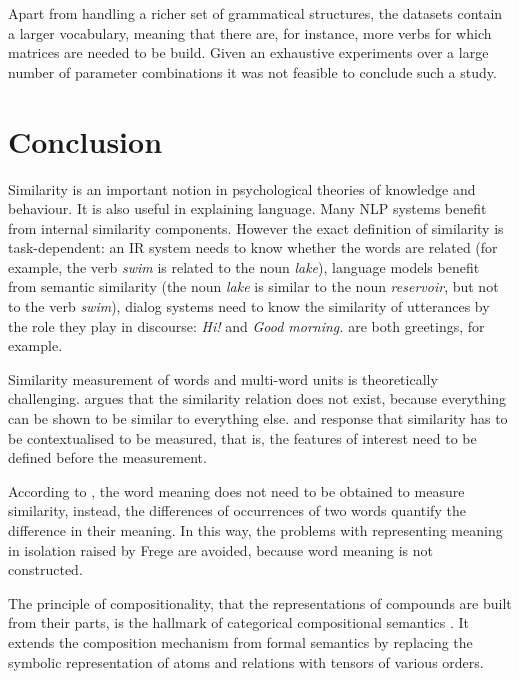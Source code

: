 Apart from handling a richer set of grammatical structures, the datasets contain a larger vocabulary, meaning that there are, for instance, more verbs for which matrices are needed to be build. Given an exhaustive experiments over a large number of parameter combinations it was not feasible to conclude such a study.

\section{Conclusion}
\label{sec:conclusion-background}

Similarity is an important notion in psychological theories of knowledge and behaviour. It is also useful in explaining language. Many NLP systems benefit from internal similarity components. However the exact definition of similarity is task-dependent: an IR system needs to know whether the words are related (for example, the verb \textit{swim} is related to the noun \textit{lake}), language models benefit from semantic similarity (the noun \textit{lake} is similar to the noun \textit{reservoir}, but not to the verb \textit{swim}), dialog systems need to know the similarity of utterances by the role they play in  discourse: \textit{Hi!} and \textit{Good morning.} are both greetings, for example.

Similarity measurement of words and multi-word units is theoretically challenging.  argues that the similarity relation does not exist, because everything can be shown to be similar to everything else.  and  response that similarity has to be contextualised to be measured, that is, the features of interest need to be defined before the measurement.

According to , the word meaning does not need to be obtained to measure similarity, instead, the differences of occurrences of two words quantify the difference in their meaning. In this way, the problems with representing meaning in isolation raised by Frege are avoided, because word meaning is not constructed.

The principle of compositionality, that the representations of compounds are built from their parts, is the hallmark of categorical compositional semantics \cite{DBLP:journals/corr/abs-1003-4394}. It extends the composition mechanism from formal semantics by replacing the symbolic representation of atoms and relations with tensors of various orders.

